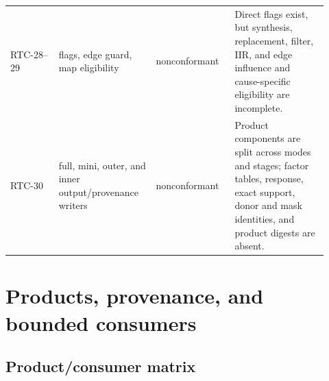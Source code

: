\documentclass[11pt]{article}
\begin{document}
\begin{longtable}{@{}L{0.14\linewidth}L{0.29\linewidth}L{0.22\linewidth}L{0.27\linewidth}@{}}
RTC-28--29 & flags, edge guard, map eligibility & nonconformant & Direct flags exist, but synthesis, replacement, filter, IIR, and edge influence and cause-specific eligibility are incomplete. \\
RTC-30 & full, mini, outer, and inner output/provenance writers & nonconformant & Product components are split across modes and stages; factor tables, response, exact support, donor and mask identities, and product digests are absent. \\
\bottomrule
\end{longtable}

\section{Products, provenance, and bounded consumers}

\subsection{Product/consumer matrix}
\end{document}
